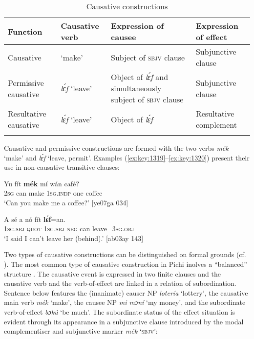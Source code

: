 \begin{table}
\caption{Causative constructions}
\label{tab:key:9.12}
\small
\begin{tabularx}{\textwidth}{XlQQ}
\lsptoprule

Function & Causative verb & Expression of causee & Expression of effect \\
\midrule
Causative &  ‘make’ & Subject of \textsc{sbjv} clause & Subjunctive clause \\
\tablevspace
Permissive causative & \textit{lɛ́f} ‘leave’ & Object of \textit{lɛ́f} and simultaneously subject of \textsc{sbjv} clause & Subjunctive clause \\
\tablevspace
Resultative causative & \textit{lɛ́f} ‘leave’ & Object of \textit{lɛ́f} & Resultative complement\\
\lspbottomrule
\end{tabularx}
\end{table}
Causative and permissive constructions are formed with the two verbs \textit{mék} ‘make’ and \textit{lɛ́f} ‘leave, permit’. Examples (\ref{ex:key:1319}–\ref{ex:key:1320}) present their use in non-causative transitive clauses:


\ea%
    \label{ex:key:1319}
    \gll Yu  fít  \textbf{mék}    mí    wán    café?\\
\textsc{2sg}  can  make  \textsc{1sg.indp}  one    coffee\\

\glt ‘Can you make me a coffee?’ [ye07ga 034]
\z


\ea%
    \label{ex:key:1320}
    \gll A    sé    a    nó  fít  \textbf{lɛ́f}=an.\\
\textsc{1sg.sbj}  \textsc{quot}    \textsc{1sg.sbj}  \textsc{neg}  can  leave=\textsc{3sg.obj}\\

\glt ‘I said I can’t leave her (behind).’ [ab03ay 143]
\z

Two types of causative constructions can be distinguished on formal grounds (cf. \citealt{Yakpo2012a,Yakpo2017}). The most common type of causative construction in Pichi inolves a “balanced” structure \citep{Cristofaro2003}. The causative event is expressed in two finite clauses and the causative verb and the verb-of-effect are linked in a relation of subordination. Sentence  below features the (inanimate) causer NP \textit{lotería} ‘lottery’, the causative main verb \textit{mék} ‘make’, the causee NP \textit{mi mɔní} ‘my money’, and the subordinate verb-of-effect \textit{bɔkú} ‘be much’. The subordinate status of the effect situation is evident through its appearance in a subjunctive clause introduced by the modal complementiser and subjunctive marker \textit{mék} ‘\textsc{sbjv}’:


